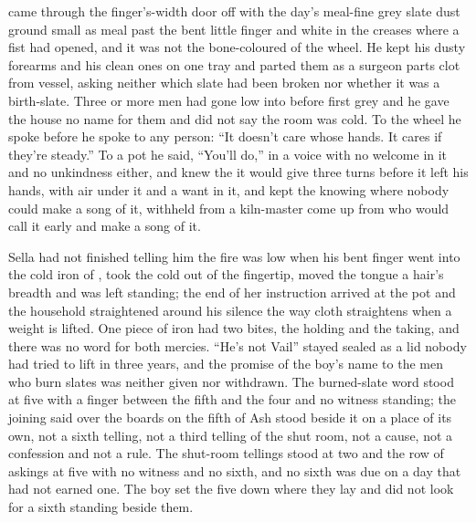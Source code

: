  came through the finger's-width door off  with the day's meal-fine grey slate dust ground small as meal past the bent little finger and white in the creases where a fist had opened, and it was not the bone-coloured  of the wheel. He kept his dusty forearms and his clean ones on one tray and parted them as a surgeon parts clot from vessel, asking neither which slate had been broken nor whether it was a birth-slate. Three or more men had gone low into  before first grey and he gave the house no name for them and did not say the room was cold. To the wheel he spoke before he spoke to any person: “It doesn't care whose hands. It cares if they're steady.” To a pot he said, “You'll do,” in a voice with no welcome in it and no unkindness either, and knew the  it would give three turns before it left his hands, with air under it and a want in it, and kept the knowing where nobody could make a song of it, withheld from a kiln-master come up from  who would call it early and make a song of it.

Sella had not finished telling him the fire was low when his bent finger went into the cold iron of , took the cold out of the fingertip, moved the tongue a hair's breadth and was left standing; the end of her instruction arrived at the pot and the household straightened around his silence the way cloth straightens when a weight is lifted. One piece of iron had two bites, the holding and the taking, and there was no  word for both mercies. “He's not Vail” stayed sealed as a lid nobody had tried to lift in three years, and the promise of the boy's name to the men who burn slates was neither given nor withdrawn. The burned-slate word stood at five with a finger between the fifth and the four and no witness standing; the joining said over the boards on the fifth of Ash stood beside it on a place of its own, not a sixth telling, not a third telling of the shut room, not a cause, not a confession and not a rule. The shut-room tellings stood at two and the row of askings at five with no witness and no sixth, and no sixth was due on a day that had not earned one. The boy set the five down where they lay and did not look for a sixth standing beside them.

\scenebreak

